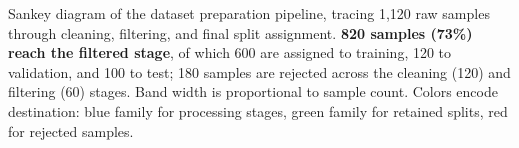 \caption{Sankey diagram of the dataset preparation pipeline, tracing 1{,}120 raw samples through cleaning, filtering, and final split assignment. \textbf{820 samples (73\%) reach the filtered stage}, of which 600 are assigned to training, 120 to validation, and 100 to test; 180 samples are rejected across the cleaning (120) and filtering (60) stages. Band width is proportional to sample count. Colors encode destination: blue family for processing stages, green family for retained splits, red for rejected samples.}
